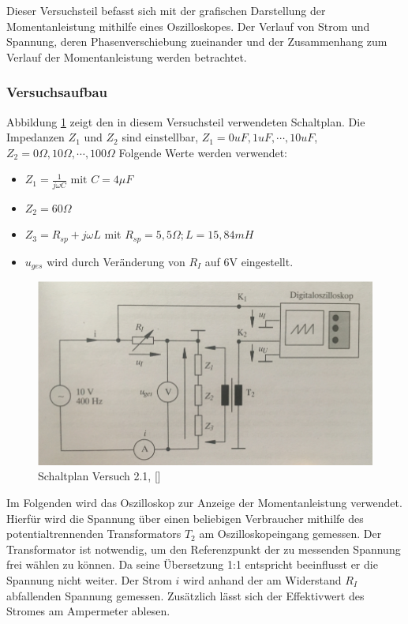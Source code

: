 \label{sec:Versuch2.2.1}
Dieser Versuchsteil befasst sich mit der grafischen Darstellung der Momentanleistung mithilfe eines Oszilloskopes. Der Verlauf von Strom und Spannung, deren Phasenverschiebung zueinander und der Zusammenhang zum Verlauf der Momentanleistung werden betrachtet.


\subsubsection{Versuchsaufbau}
\label{sec:Aufbau2.2.1}

Abbildung \ref{fig:Plan2-1} zeigt den in diesem Versuchsteil verwendeten Schaltplan. Die Impedanzen $Z_1$ und $Z_2$ sind einstellbar, $Z_1 = 0uF, 1uF, \cdots, 10uF$, $Z_2 =  0\Omega, 10\Omega, \cdots, 100\Omega$ Folgende Werte werden verwendet:
\begin{itemize}
\item $Z_1 = \frac{1}{j\omega C} \mbox{ mit } C=4\mu F$
\item $Z_2 = 60\Omega$
\item $Z_3 = R_{sp} + j\omega L$ mit $R_{sp} = 5,5\Omega; L=15,84mH$
\item $u_{ges}$ wird durch Veränderung von $R_I$ auf 6V eingestellt.
\end{itemize}

\begin{figure}[h]
\centering
\includegraphics[width=0.7\linewidth]{Images/Aufbau2-1.png}
\caption{Schaltplan Versuch 2.1, [\cite[47]{GEMLBuch}]}
\label{fig:Plan2-1}
\end{figure}

Im Folgenden wird das Oszilloskop zur Anzeige der Momentanleistung verwendet. Hierfür wird die Spannung über einen beliebigen Verbraucher mithilfe des potentialtrennenden Transformators $T_2$ am Oszilloskopeingang gemessen. Der Transformator ist notwendig, um den Referenzpunkt der zu messenden Spannung frei wählen zu können. Da seine Übersetzung 1:1 entspricht beeinflusst er die Spannung nicht weiter. Der Strom $i$ wird anhand der am Widerstand $R_I$ abfallenden Spannung gemessen. Zusätzlich lässt sich der Effektivwert des Stromes am Ampermeter ablesen.

